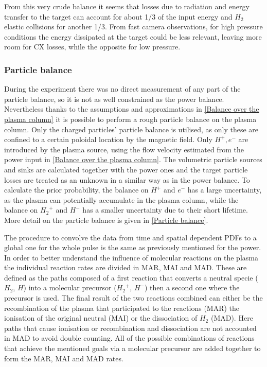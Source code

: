 From this very crude balance it seems that losses due to radiation and energy transfer to the target can account for about 1/3 of the input energy and $H_2$ elastic collisions for another 1/3. From fast camera observations, for high pressure conditions the energy dissipated at the target could be less relevant, leaving more room for CX losses, while the opposite for low pressure.

\subsubsection{Particle balance}\label{Particle balance bayesian}
During the experiment there was no direct measurement of any part of the particle balance, so it is not as well constrained as the power balance. Nevertheless thanks to the assumptions and approximations in \autoref{Balance over the plasma column} it is possible to perform a rough particle balance on the plasma column. Only the charged particles' particle balance is utilised, as only these are confined to a certain poloidal location by the magnetic field. Only $H^+, e^-$ are introduced by the plasma source, using the flow velocity estimated from the power input in \autoref{Balance over the plasma column}. The volumetric particle sources and sinks are calculated together with the power ones and the target particle losses are treated as an unknown in a similar way as in the power balance. To calculate the prior probability, the balance on $H^+$ and $e^-$ has a large uncertainty, as the plasma can potentially accumulate in the plasma column, while the balance on ${H_2}^+$ and $H^-$ has a smaller uncertainty due to their short lifetime. More detail on the particle balance is given in \ref{Particle balance}. 

The procedure to convolve the data from time and spatial dependent PDFs to a global one for the whole pulse is the same as previously mentioned for the power. In order to better understand the influence of molecular reactions on the plasma the individual reaction rates are divided in MAR, MAI and MAD. These are defined as the paths composed of a first reaction that converts a neutral specie ($H_2$, $H$) into a molecular precursor (${H_2}^+$, $H^-$) then a second one where the precursor is used. The final result of the two reactions combined can either be the recombination of the plasma that participated to the reactions (MAR) the ionisation of the original neutral (MAI) or the dissociation of $H_2$ (MAD). Here paths that cause ionisation or recombination and dissociation are not accounted in MAD to avoid double counting. All of the possible combinations of reactions that achieve the mentioned goals via a molecular precursor are added together to form the MAR, MAI and MAD rates.\cite{Verhaegh2020} 



